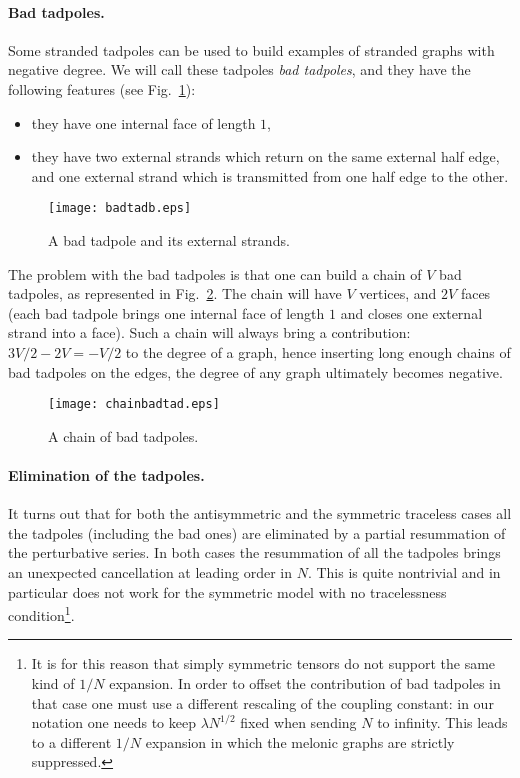 \documentclass[10pt]{article}
\theoremstyle{plain}
\theoremstyle{definition}
\begin{document}
\paragraph{Bad tadpoles.} Some stranded tadpoles can be used to build examples of stranded graphs with negative degree. We will call these tadpoles \emph{bad tadpoles}, and they  
have the following features (see Fig.~\ref{fig:badtad}):
 \begin{itemize}
  \item they have one internal face of length $1$,
  \item they have two external strands which return on the same external half edge, and one external strand which is transmitted from one half edge to the other.
 \end{itemize}
   \begin{figure}[htb]
 \begin{center}
 \texttt{[image: badtadb.eps]}  
 \caption{A bad tadpole and its external strands.}\label{fig:badtad}
 \end{center}
 \end{figure}
 
 The problem with the bad tadpoles is that one can build a chain of $V$ bad tadpoles, as represented in Fig.~\ref{fig:chainbadtad}. The chain will have $V$ vertices, and $2V$ faces (each bad tadpole
 brings one  internal face of length $1$ and closes one external strand into a face). Such a chain will always bring a contribution:
$3V/2 - 2V = -V/2$ to the degree of a graph, hence inserting long enough chains of bad tadpoles on the edges, the degree of any graph ultimately becomes negative. 
   \begin{figure}[htb]
 \begin{center}
 \texttt{[image: chainbadtad.eps]}  
 \caption{A chain of bad tadpoles.}\label{fig:chainbadtad}
 \end{center}
 \end{figure}


\paragraph{Elimination of the tadpoles.}
It turns out that for both the antisymmetric and the symmetric traceless cases all the tadpoles (including the bad ones) are eliminated by a partial resummation of the perturbative series.
In both cases the resummation of all the tadpoles brings an unexpected cancellation at leading order in $N$. This is quite nontrivial and in particular does not work for the  
symmetric model with no tracelessness condition\footnote{It is for this reason that simply symmetric tensors do not support the same kind of $1/N$ expansion. In order to offset the contribution of bad tadpoles
in that case one must use a different rescaling of the coupling constant: in our notation one needs 
to keep $\lambda N^{1/2}$ fixed  when sending $N$ to infinity. This leads to a different $1/N$ expansion in which
the  melonic graphs are strictly suppressed.}.
\end{document}
